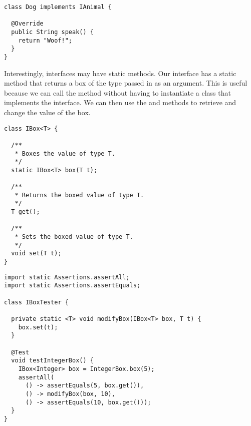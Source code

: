 \begin{lstlisting}[language=MyJava]
class Dog implements IAnimal {

  @Override
  public String speak() { 
    return "Woof!"; 
  }
}
\end{lstlisting}


Interestingly, interfaces may have static methods. Our  interface has a static  method that returns a box of the type passed in as an argument. This is useful because we can call the  method without having to instantiate a class that implements the  interface. We can then use the  and  methods to retrieve and change the value of the box.


\begin{lstlisting}[language=MyJava]
class IBox<T> {
  
  /**
   * Boxes the value of type T.
   */
  static IBox<T> box(T t);

  /**
   * Returns the boxed value of type T.
   */
  T get();

  /**
   * Sets the boxed value of type T.
   */
  void set(T t);
}
\end{lstlisting}

\begin{lstlisting}[language=MyJava]
import static Assertions.assertAll;
import static Assertions.assertEquals;

class IBoxTester {

  private static <T> void modifyBox(IBox<T> box, T t) {
    box.set(t);
  }
  
  @Test
  void testIntegerBox() {
    IBox<Integer> box = IntegerBox.box(5);
    assertAll(
      () -> assertEquals(5, box.get()),
      () -> modifyBox(box, 10),
      () -> assertEquals(10, box.get()));
  }
}
\end{lstlisting}

